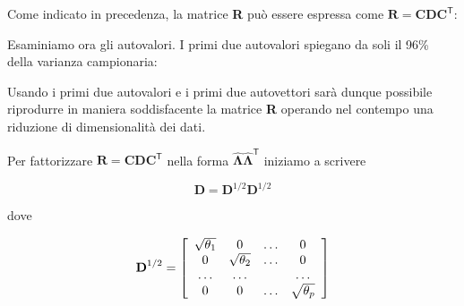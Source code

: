 \documentclass[
  11pt,
]{krantz}
\makeatletter
\newenvironment{Shaded}{\begin{snugshade}}{\end{snugshade}}
\newcommand{\CommentTok}[1]{\textcolor[rgb]{0.37,0.37,0.37}{\textit{#1}}}
\newcommand{\DecValTok}[1]{\textcolor[rgb]{0.06,0.06,0.06}{#1}}
\newcommand{\FunctionTok}[1]{\textcolor[rgb]{0,0,0}{#1}}
\newcommand{\NormalTok}[1]{#1}
\newcommand{\SpecialCharTok}[1]{\textcolor[rgb]{0,0,0}{#1}}
\newenvironment{kframe}{%
\medskip{}
\setlength{\fboxsep}{.8em}
 \def\at@end@of@kframe{}%
 \ifinner\ifhmode%
  \def\at@end@of@kframe{\end{minipage}}%
  \begin{minipage}{\columnwidth}%
 \fi\fi%
 \def\FrameCommand##1{\hskip\@totalleftmargin \hskip-\fboxsep
 \colorbox{shadecolor}{##1}\hskip-\fboxsep
     \hskip-\linewidth \hskip-\@totalleftmargin \hskip\columnwidth}%
 \MakeFramed {\advance\hsize-\width
   \@totalleftmargin\z@ \linewidth\hsize
   \@setminipage}}%
 {\par\unskip\endMakeFramed%
 \at@end@of@kframe}
\renewenvironment{Shaded}{\begin{kframe}}{\end{kframe}}
\theoremstyle{definition}
\theoremstyle{definition}
\theoremstyle{definition}
\theoremstyle{definition}
\theoremstyle{remark}
\makeatother
\begin{document}
Come indicato in precedenza, la matrice \textbf{R} può essere espressa come \(\textbf{R} = \textbf{C}\textbf{D}\textbf{C}^{\ensuremath{\mathsf{T}}}\):

\begin{Shaded}
\end{Shaded}

Esaminiamo ora gli autovalori. I primi due autovalori spiegano da soli il 96\% della varianza campionaria:

\begin{Shaded}
\end{Shaded}

Usando i primi due autovalori e i primi due autovettori sarà dunque possibile riprodurre in maniera soddisfacente la matrice \textbf{R} operando nel contempo una riduzione di dimensionalità dei dati.

Per fattorizzare \(\textbf{R} = \textbf{C}\textbf{D}\textbf{C}^{\ensuremath{\mathsf{T}}}\) nella forma \(\hat{\boldsymbol{\Lambda}} \hat{\boldsymbol{\Lambda}}^{\ensuremath{\mathsf{T}}}\) iniziamo a scrivere

\[\textbf{D}= \textbf{D}^{1/2} \textbf{D}^{1/2}\]

dove

\[
\textbf{D}^{1/2} = 
\left[
  \begin{array}{ c c c c }
     \sqrt{\theta_1} & 0 & \dots & 0 \\
     0 & \sqrt{\theta_2} & \dots & 0 \\
     \dots & \dots & & \dots \\
     0 & 0 & \dots &  \sqrt{\theta_p}
  \end{array} 
\right]
\]
\end{document}
